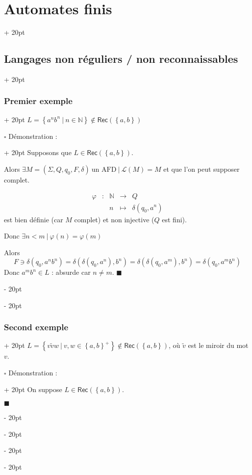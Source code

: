 \documentclass[a4paper, 12pt, twoside]{article}
\newcommand{\N}{\mathbb{N}} %
\newcommand{\lr}[1]{\left( #1 \right)}
\newcommand{\set}[1]{\left\{ #1 \right\}}
\newcommand{\ind}[1][20pt]{\advance\leftskip + #1}
\newcommand{\deind}[1][20pt]{\advance\leftskip - #1}
\newenvironment{indt}[2][20pt]{#2 \par \ind[#1]}{\par \deind} %
\newenvironment{proof}[1][{Démonstration :}]{\begin{indt}{$\square$ #1}}{$\blacksquare$ \end{indt}}
\newcommand{\Rec}[1]{\mathsf{Rec}\!\lr{#1}}
\begin{document}
\begin{indt}{\section{Automates finis}}
\begin{indt}{\subsection{Langages non réguliers / non reconnaissables}}
\begin{indt}{\subsubsection{Premier exemple}}
                $L = \set{a^n b^n\ |\ n \in \N} \notin \Rec{\set{a, b}}$

                \vspace{12pt}
                
                \begin{proof}
                    Supposons que $L \in \Rec{\set{a, b}}$.

                    Alors $\exists M = \lr{\Sigma, Q, q_0, F, \delta}\ \text{un AFD}\ |\ \mathcal L(M) = M$ et que l'on peut supposer complet.

                    \[
                        \begin{array}{ccccc}
                            \varphi & : & \N & \longrightarrow & Q
                            \\
                                    && n & \longmapsto & \delta(q_0, a^n)
                        \end{array}
                    \]
                    est bien définie (car $M$ complet) et non injective ($Q$ est fini).

                    Donc $\exists n < m\ |\ \varphi(n) = \varphi(m)$

                    Alors
                    \[
                        F \ni \delta(q_0, a^n b^n)
                        = \delta(\delta(q_0, a^n), b^n)
                        = \delta(\delta(q_0, a^m), b^n)
                        = \delta(q_0, a^m b^n)
                    \]
                    Donc $a^m b^n \in L$ : absurde car $n \neq m$.
                \end{proof}
            \end{indt}

            \vspace{12pt}
            
            \begin{indt}{\subsubsection{Second exemple}}
                $L = \set{v \widetilde v w\ |\ v, w \in \set{a, b}^+} \notin \Rec{\set{a, b}}$, où $\widetilde v$ est le miroir du mot $v$.

                \vspace{12pt}
                
                \begin{proof}
                    On suppose $L \in \Rec{\set{a, b}}$.
                    

\end{proof}
\end{indt}
\end{indt}
\end{indt}
\end{document}
